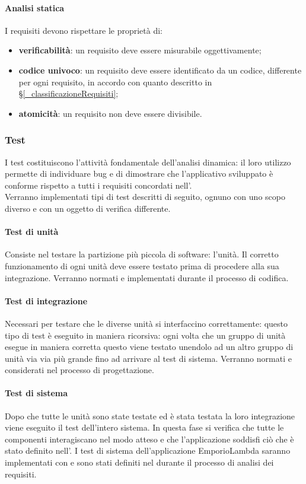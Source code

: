 \paragraph{Analisi statica}
I requisiti devono rispettare le proprietà di:
\begin{itemize}
    \item \textbf{verificabilità}: un requisito deve essere misurabile oggettivamente;
    \item \textbf{codice univoco}: un requisito deve essere identificato da un codice, differente per ogni requisito, in accordo con quanto descritto in \S\ref{_classificazioneRequisiti};
    \item \textbf{atomicità}: un requisito non deve essere divisibile.
\end{itemize}

\subsubsection{Test}
I test costituiscono l'attività fondamentale dell'analisi dinamica: il loro utilizzo permette di individuare bug e di dimostrare che l'applicativo sviluppato è conforme rispetto a tutti i requisiti concordati nell'.\\
Verranno implementati tipi di test descritti di seguito, ognuno con uno scopo diverso e con un oggetto di verifica differente.
\paragraph{Test di unità}
Consiste nel testare la partizione più piccola di software: l'unità. Il corretto funzionamento di ogni unità deve essere testato prima di procedere alla sua integrazione.
Verranno normati e implementati durante il processo di codifica.

\paragraph{Test di integrazione}
Necessari per testare che le diverse unità si interfaccino correttamente: questo tipo di test è eseguito in maniera ricorsiva: ogni volta che un gruppo di unità esegue in maniera corretta questo viene testato unendolo ad un altro gruppo di unità via via più grande fino ad arrivare al test di sistema.
Verranno normati e considerati nel processo di progettazione.

\paragraph{Test di sistema}
Dopo che tutte le unità sono state testate ed è stata testata la loro integrazione viene eseguito il test dell'intero sistema. In questa fase si verifica che tutte le componenti interagiscano nel modo atteso e che l'applicazione soddisfi ciò che è stato definito nell'.
I test di sistema dell'applicazione EmporioLambda saranno implementati con  e sono stati definiti nel  durante il processo di analisi dei requisiti.

